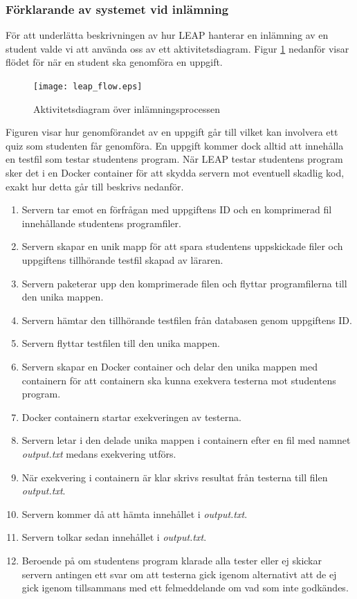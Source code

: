 \documentclass[a4paper,11pt]{article}
\begin{document}
{\newpage
\subsubsection{Förklarande av systemet vid inlämning}

För att underlätta beskrivningen av hur LEAP hanterar en inlämning av en student valde vi att använda oss av ett aktivitetsdiagram. Figur \ref{fig:LeapFlow} nedanför visar flödet för när en student ska genomföra en uppgift.

\begin{figure}[ht!]
\centering
\texttt{[image: leap\_flow.eps]}
\caption{Aktivitetsdiagram över inlämningsprocessen}
\label{fig:LeapFlow}
\end{figure}

Figuren visar hur genomförandet av en uppgift går till vilket kan involvera ett quiz som studenten får genomföra. En uppgift kommer dock alltid att innehålla en testfil som testar studentens program. När LEAP testar studentens program sker det i en Docker container för att skydda servern mot eventuell skadlig kod, exakt hur detta går till beskrivs nedanför.

\begin{enumerate}
\item
Servern tar emot en förfrågan med uppgiftens ID och en komprimerad fil innehållande studentens programfiler.
\item
Servern skapar en unik mapp för att spara studentens uppskickade filer och uppgiftens tillhörande testfil skapad av läraren.
\item
Servern paketerar upp den komprimerade filen och flyttar programfilerna till den unika mappen.
\item
Servern hämtar den tillhörande testfilen från databasen genom uppgiftens ID.
\item
Servern flyttar testfilen till den unika mappen.
\item
Servern skapar en Docker container och delar den unika mappen med containern för att containern ska kunna exekvera testerna mot studentens program.
\item
Docker containern startar exekveringen av testerna.
\item
Servern letar i den delade unika mappen i containern efter en fil med namnet \textit{output.txt} medans exekvering utförs.
\item
När exekvering i containern är klar skrivs resultat från testerna till filen \textit{output.txt}.
\item
Servern kommer då att hämta innehållet i \textit{output.txt}.
\item
Servern tolkar sedan innehållet i \textit{output.txt}.
\item
Beroende på om studentens program klarade alla tester eller ej skickar servern antingen ett svar om att testerna gick igenom alternativt att de ej gick igenom tillsammans med ett felmeddelande om vad som inte godkändes.
\end{enumerate}

}
\end{document}
